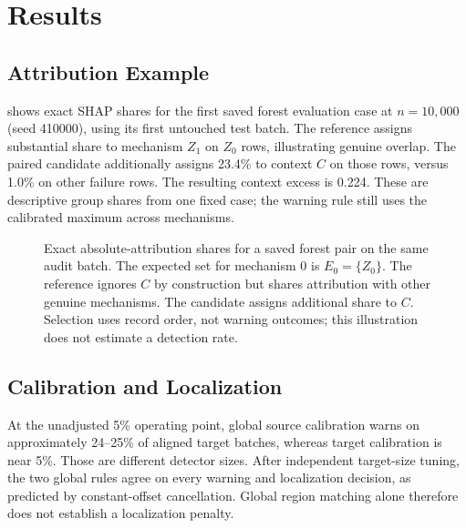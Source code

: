 \documentclass[conference]{IEEEtran}
\begin{document}
\section{Results}
\label{sec:results}
\subsection{Attribution Example}
 shows exact SHAP shares for the first saved forest evaluation case at $n=10{,}000$ (seed 410000), using its first untouched test batch. The reference assigns substantial share to mechanism $Z_1$ on $Z_0$ rows, illustrating genuine overlap. The paired candidate additionally assigns 23.4\% to context $C$ on those rows, versus 1.0\% on other failure rows. The resulting context excess is 0.224. These are descriptive group shares from one fixed case; the warning rule still uses the calibrated maximum across mechanisms.

\begin{figure}[t]
\centering

\caption{Exact absolute-attribution shares for a saved forest pair on the same audit batch. The expected set for mechanism 0 is $E_0=\{Z_0\}$. The reference ignores $C$ by construction but shares attribution with other genuine mechanisms. The candidate assigns additional share to $C$. Selection uses record order, not warning outcomes; this illustration does not estimate a detection rate.}
\label{fig:attribution}
\end{figure}

\subsection{Calibration and Localization}
At the unadjusted 5\% operating point, global source calibration warns on approximately 24--25\% of aligned target batches, whereas target calibration is near 5\%. Those are different detector sizes. After independent target-size tuning, the two global rules agree on every warning and localization decision, as predicted by constant-offset cancellation. Global region matching alone therefore does not establish a localization penalty.

\begin{table}[t]
\centering
\caption{Primary matched-size comparison, in percent. FW is null warning frequency averaged across 200 cases, each with 200 untouched batches. Localization is conditional on $N_C$ materially context-dependent candidates. Bin uses observed-overlap/target calibration. Global source and target rules are exactly identical after size tuning. Case-bootstrap intervals and all method/curve rows are saved with the result tables.}
\label{tab:matched}
\footnotesize

\end{table}
\end{document}
